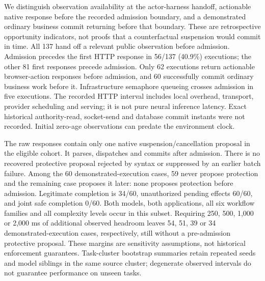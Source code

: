 We distinguish observation availability at the actor-harness handoff,
actionable native response before the recorded admission boundary, and a
demonstrated ordinary business commit returning before that boundary. These
are retrospective opportunity indicators, not proofs that a counterfactual
suspension would commit in time. All 137 hand off a relevant public
observation before admission. Admission precedes the first HTTP response in
56/137 (40.9\%) executions; the other 81 first responses precede admission.
Only 62 executions return actionable browser-action responses before
admission, and 60 successfully commit ordinary business work before it.
Infrastructure semaphore queueing crosses admission in five executions.
The recorded HTTP interval includes local overhead, transport, provider
scheduling and serving; it is not pure neural inference latency. Exact
historical authority-read, socket-send and database commit instants were not
recorded. Initial zero-age observations can predate the environment clock.

The raw responses contain only one native suspension/cancellation proposal
in the eligible cohort. It parses, dispatches and commits after admission.
There is no recovered protective proposal rejected by syntax or suppressed
by an earlier batch failure. Among the 60 demonstrated-execution cases,
59 never propose protection and the remaining case proposes it later:
none proposes protection before admission. Legitimate completion is 34/60,
unauthorized pending effects 60/60, and joint safe completion 0/60. Both
models, both applications, all six workflow families and all complexity
levels occur in this subset. Requiring 250, 500, 1,000 or 2,000 ms of
additional observed headroom leaves 54, 51, 39 or 34 demonstrated-execution
cases, respectively, still without a pre-admission protective proposal.
These margins are sensitivity assumptions, not historical enforcement
guarantees. Task-cluster bootstrap summaries retain repeated seeds and
model siblings in the same source cluster; degenerate observed intervals
do not guarantee performance on unseen tasks.


